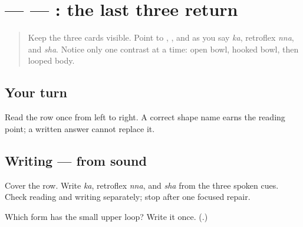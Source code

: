 \section[\texorpdfstring{\gu{ક} — \gu{ણ} — \gu{શ} (ka — retroflex nna — sha)}{ક — ણ — શ (ka — retroflex nna — sha)}]{ —  — : the last three return}

\label{lesson:GU-R03-doorway-three-r1}



\begin{quote}
Keep the three cards visible. Point to \textbf{}, \textbf{}, and \textbf{} as you say \emph{ka}, retroflex \emph{nna}, and \emph{sha}. Notice only one contrast at a time: open bowl, hooked bowl, then looped body.
\end{quote}

\subsection*{Your turn}
Read the row once from left to right. A correct shape name earns the reading point; a written answer cannot replace it.

\subsection*{Writing — from sound}
Cover the row. Write \emph{ka}, retroflex \emph{nna}, and \emph{sha} from the three spoken cues. Check reading and writing separately; stop after one focused repair.

\begin{tcolorbox}[breakable,colback=teal!4,colframe=teal!35!black,title={Before you move on}]
Which form has the small upper loop? Write it once. (\textbf{}.)
\end{tcolorbox}
